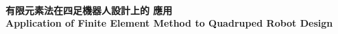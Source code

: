 \documentclass[14pt,a4paper]{report}  %
\begin{document}
\sectionef %
\vspace{12em}
\begin{titlepage}%
\begin{center}   %
\\[18pt]
\\[18pt]
\\[18pt]
\vspace{6em} %
\fontsize{30pt}{1em}\selectfont\textbf
{
\vspace{0.5em}
有限元素法在四足機器人設計上的
應用}\\

\vspace{1em}
\sectionef\fontsize{30pt}{1em}\selectfont\textbf
{
\vspace{0.5em}
Application of Finite Element Method
\vspace{0.5em}
to
 \vspace{0.5em} 
Quadruped Robot Design}
 \vspace{1em}
\end{center}
\begin{flushleft}
\begin{LARGE}


\end{LARGE}
\end{flushleft}
\end{titlepage}
\end{document}
